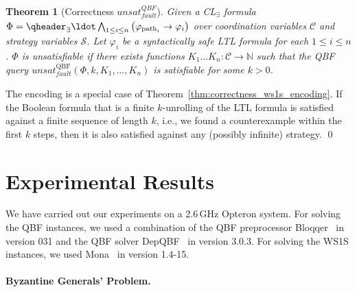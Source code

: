 \documentclass{LMCS}
\newcommand{\unsatnf}{\mathit{unsat}_\mathit{fault}}
\theoremstyle{plain}\newtheorem{theorem}[thm]{Theorem}
\theoremstyle{plain}\newtheorem{lemma}[thm]{Lemma}
\theoremstyle{plain}\newtheorem{proposition}[thm]{Proposition}
\theoremstyle{plain}\newtheorem{corollary}[thm]{Corollary}
\theoremstyle{definition}\newtheorem{definition}{Definition}[section]
\begin{document}
\begin{theorem}[Correctness $\unsatnf^\mathit{QBF}$] \label{thm:correctness_qbf_encoding}
  Given a CL$_\exists$ formula $\Phi = \qheader_\exists \ldot \bigwedge_{1 \leq i \leq n} \big( \varphi_{\text{path}_i} \allowbreak \rightarrow \varphi_i \big)$ over coordination variables $\mathcal{C}$ and strategy variables $\mathcal{S}$.
  Let $\varphi_i$ be a syntactically safe LTL formula for each $1 \leq i \leq n$.
  $\Phi$ is unsatisfiable if there exists functions $K_1 \dots K_n : \mathcal{C} \rightarrow \mathbb{N}$ such that the QBF query $\unsatnf^\text{QBF}(\Phi,k,K_1,\dots,K_n)$ is satisfiable for some $k > 0$.
\end{theorem}
\proof
The encoding is a special case of Theorem~\ref{thm:correctness_ws1s_encoding}.
If the Boolean formula that is a finite $k$-unrolling of the LTL formula is satisfied against a finite sequence of length $k$, i.e., we found a counterexample within the first $k$ steps, then it is also satisfied against any (possibly infinite) strategy.
\qed









\section{Experimental Results}


We have carried out our experiments on a 2.6\,GHz Opteron system.
For solving the QBF instances, we used a combination of the QBF preprocessor Bloqqer~\cite{DBLP:conf/cade/BiereLS11} in version 031 and the QBF solver DepQBF~\cite{DBLP:journals/jsat/LonsingB10} in version 3.0.3.
For solving the WS1S instances, we used Mona~\cite{DBLP:conf/tacas/HenriksenJJKPRS95} in version 1.4-15.

\paragraph{\bf Byzantine Generals' Problem.}
\end{document}
